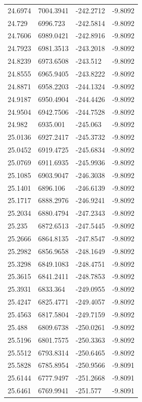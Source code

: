 \begin{table}[H]
\begin{tabular}{llll}
24.6974 & 7004.3941 & -242.2712 & -9.8092 \\
24.729 & 6996.723 & -242.5814 & -9.8092 \\
24.7606 & 6989.0421 & -242.8916 & -9.8092 \\
24.7923 & 6981.3513 & -243.2018 & -9.8092 \\
24.8239 & 6973.6508 & -243.512 & -9.8092 \\
24.8555 & 6965.9405 & -243.8222 & -9.8092 \\
24.8871 & 6958.2203 & -244.1324 & -9.8092 \\
24.9187 & 6950.4904 & -244.4426 & -9.8092 \\
24.9504 & 6942.7506 & -244.7528 & -9.8092 \\
24.982 & 6935.001 & -245.063 & -9.8092 \\
25.0136 & 6927.2417 & -245.3732 & -9.8092 \\
25.0452 & 6919.4725 & -245.6834 & -9.8092 \\
25.0769 & 6911.6935 & -245.9936 & -9.8092 \\
25.1085 & 6903.9047 & -246.3038 & -9.8092 \\
25.1401 & 6896.106 & -246.6139 & -9.8092 \\
25.1717 & 6888.2976 & -246.9241 & -9.8092 \\
25.2034 & 6880.4794 & -247.2343 & -9.8092 \\
25.235 & 6872.6513 & -247.5445 & -9.8092 \\
25.2666 & 6864.8135 & -247.8547 & -9.8092 \\
25.2982 & 6856.9658 & -248.1649 & -9.8092 \\
25.3298 & 6849.1083 & -248.4751 & -9.8092 \\
25.3615 & 6841.2411 & -248.7853 & -9.8092 \\
25.3931 & 6833.364 & -249.0955 & -9.8092 \\
25.4247 & 6825.4771 & -249.4057 & -9.8092 \\
25.4563 & 6817.5804 & -249.7159 & -9.8092 \\
25.488 & 6809.6738 & -250.0261 & -9.8092 \\
25.5196 & 6801.7575 & -250.3363 & -9.8092 \\
25.5512 & 6793.8314 & -250.6465 & -9.8092 \\
25.5828 & 6785.8954 & -250.9566 & -9.8091 \\
25.6144 & 6777.9497 & -251.2668 & -9.8091 \\
25.6461 & 6769.9941 & -251.577 & -9.8091 \\

\end{tabular}
\end{table}
